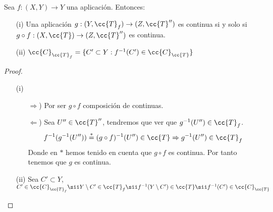 \begin{prop}
    Sea $f:(X,Y)\to Y$ una aplicación. Entonces:
    \begin{enumerate}
        \item[(i)] Una aplicación $g:(Y, \cc{T}_f)\to (Z, \cc{T}'')$ es continua si y solo si $g\circ f:(X, \cc{T})\to (Z, \cc{T}'')$ es continua.
        \begin{center}
        \end{center}
        \item[(ii)] $\cc{C}_{\cc{T}_f}=\{C'\subset Y : f^{-1}(C')\in \cc{C}_{\cc{T}}\}$
    \end{enumerate}
    \begin{proof}\
        \begin{enumerate}
            \item[(i)] 
            \begin{itemize}
                \item[$\Rightarrow$)] Por ser $g\circ f$ composición de continuas.
                \item[$\Leftarrow$)] Sea $U''\in \cc{T}''$, tendremos que ver que $g^{-1}(U'')\in \cc{T}_f$.
                \begin{align*}
                    f^{-1}(g^{-1}(U'')) \overset{\ast}{=} (g\circ f)^{-1}(U'')\in \cc{T}\Rightarrow g^{-1}(U'')\in \cc{T}_f
                \end{align*}
                Donde en $\ast$ hemos tenido en cuenta que $g\circ f$ es continua. Por tanto tenemos que $g$ es continua.
            \end{itemize}
            \item[(ii)] Sea $C'\subset Y$, $C'\in \cc{C}_{\cc{T}_f}\sii Y\setminus C' \in \cc{T}_f \sii f^{-1}(Y\setminus C')\in \cc{T} \sii f^{-1}(C')\in \cc{C}_{\cc{T}}$
        \end{enumerate}
    \end{proof}
\end{prop}

